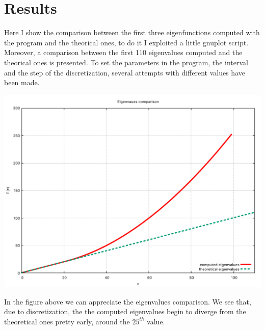 \documentclass[prb,9pt,notitlepage]{revtex4-1}
\begin{document}
\section{Results}
Here I show the comparison between the first three eigenfunctions computed with the program and the theorical ones, to do it I exploited a little gnuplot script. Moreover, a comparison between the first 110 eigenvalues computed and the theorical ones is presented. To set the parameters in the program, the interval and the step of the discretization, several attempts with different values have been made.
\begin{center}
    \includegraphics[width=.50\textwidth]{eigenvalues_comparison}\hfill
\end{center}
In the figure above we can appreciate the eigenvalues comparison. We see that, due to discretization, the the computed eigenvalues begin to diverge from the theoretical ones pretty early, around the $25^{th}$ value.
\end{document}
